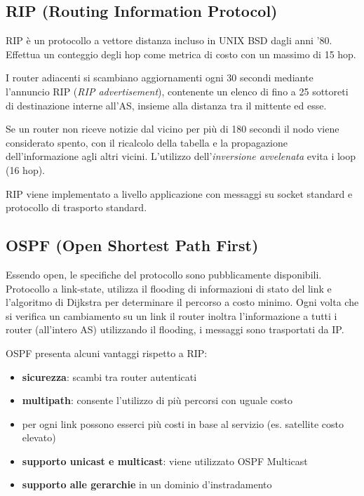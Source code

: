 \documentclass{report}
\begin{document}
\hypertarget{header-n244}{%
\subsection{RIP (Routing Information Protocol)}\label{header-n244}}

RIP è un protocollo a vettore distanza incluso in UNIX BSD dagli anni
'80. Effettua un conteggio degli hop come metrica di costo con un
massimo di 15 hop.

I router adiacenti si scambiano aggiornamenti ogni 30 secondi mediante
l'annuncio RIP (\emph{RIP advertisement}), contenente un elenco di fino
a 25 sottoreti di destinazione interne all'AS, insieme alla distanza tra
il mittente ed esse.

Se un router non riceve notizie dal vicino per più di 180 secondi il
nodo viene considerato spento, con il ricalcolo della tabella e la
propagazione dell'informazione agli altri vicini. L'utilizzo
dell'\emph{inversione avvelenata} evita i loop (16 hop).

RIP viene implementato a livello applicazione con messaggi su socket
standard e protocollo di trasporto standard.

\hypertarget{header-n249}{%
\subsection{OSPF (Open Shortest Path First)}\label{header-n249}}

Essendo open, le specifiche del protocollo sono pubblicamente
disponibili. Protocollo a link-state, utilizza il flooding di
informazioni di stato del link e l'algoritmo di Dijkstra per determinare
il percorso a costo minimo. Ogni volta che si verifica un cambiamento su
un link il router inoltra l'informazione a tutti i router (all'intero
AS) utilizzando il flooding, i messaggi sono trasportati da IP.

OSPF presenta alcuni vantaggi rispetto a RIP:

\begin{itemize}
\item
  \textbf{sicurezza}: scambi tra router autenticati
\item
  \textbf{multipath}: consente l'utilizzo di più percorsi con uguale
  costo
\item
  per ogni link possono esserci più costi in base al servizio (es.
  satellite costo elevato)
\item
  \textbf{supporto unicast e multicast}: viene utilizzato OSPF Multicast
\item
  \textbf{supporto alle gerarchie} in un dominio d'instradamento
\end{itemize}
\end{document}
